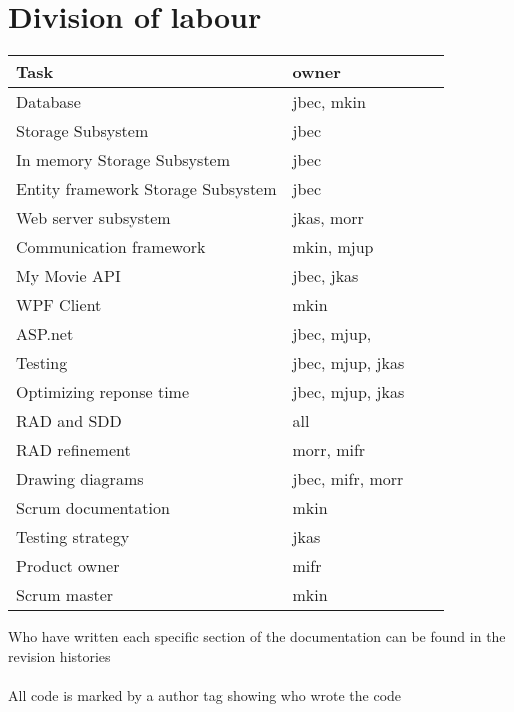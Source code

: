  \section{Division of labour}
              \begin{center}
                  \begin{tabular}{ | l | l | p{6cm} | p{4cm} |}
                  \hline
                  Task & owner \\ \hline
                  Database & jbec, mkin \\ \hline
                  Storage Subsystem & jbec \\ \hline
                  In memory Storage Subsystem & jbec \\ \hline
                  Entity framework Storage Subsystem & jbec \\ \hline
                  Web server subsystem & jkas, morr \\ \hline
                  Communication framework & mkin, mjup \\ \hline
                  My Movie API & jbec, jkas \\ \hline
                  WPF Client & mkin \\ \hline
                  ASP.net & jbec, mjup,  \\ \hline
                  Testing & jbec, mjup, jkas \\ \hline
                  Optimizing reponse time & jbec, mjup, jkas\\ \hline
                  RAD and SDD & all \\ \hline 
                  RAD refinement & morr, mifr \\ \hline 
                  Drawing diagrams & jbec, mifr, morr \\ \hline
                  Scrum documentation & mkin \\ \hline
                  Testing strategy & jkas \\ \hline
                  Product owner & mifr \\ \hline
                  Scrum master & mkin \\ \hline
                  \end{tabular}
              \end{center}
              
              Who have written each specific section of the documentation can be found in the revision histories\\
              \\
              All code is marked by a author tag showing who wrote the code
              

